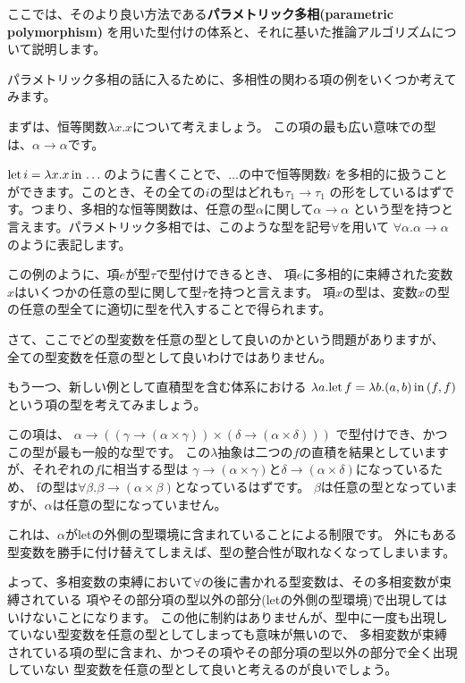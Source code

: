 ここでは、そのより良い方法である\textbf{パラメトリック多相(parametric polymorphism)}
を用いた型付けの体系と、それに基いた推論アルゴリズムについて説明します。

パラメトリック多相の話に入るために、多相性の関わる項の例をいくつか考えてみます。

まずは、恒等関数$\lambda x . x$について考えましょう。
この項の最も広い意味での型は、$\alpha \to \alpha$です。

$\mathrm{let} \, i = \lambda x . x \, \mathrm{in} \, \dots$のように書くことで、$\dots$の中で恒等関数$i$
を多相的に扱うことができます。このとき、その全ての$i$の型はどれも$\tau_1 \to \tau_1$
の形をしているはずです。つまり、多相的な恒等関数は、任意の型$\alpha$に関して$\alpha \to \alpha$
という型を持つと言えます。パラメトリック多相では、このような型を記号$\forall$を用いて
$\forall \alpha . \alpha \to \alpha$のように表記します。

この例のように、項$e$が型$\tau$で型付けできるとき、
項$e$に多相的に束縛された変数$x$はいくつかの任意の型に関して型$\tau$を持つと言えます。
項$x$の型は、変数$x$の型の任意の型全てに適切に型を代入することで得られます。

さて、ここでどの型変数を任意の型として良いのかという問題がありますが、
全ての型変数を任意の型として良いわけではありません。

もう一つ、新しい例として直積型を含む体系における
$\lambda a . \mathrm{let} \, f = \lambda b . (a, b) \, \mathrm{in} \, (f, f)$という項の型を考えてみましょう。

この項は、
$\alpha \to ((\gamma \to (\alpha \times \gamma)) \times (\delta \to (\alpha \times \delta)))$
で型付けでき、かつこの型が最も一般的な型です。
この$\lambda$抽象は二つの$f$の直積を結果としていますが、それぞれの$f$に相当する型は
$\gamma \to (\alpha \times \gamma)$と$\delta \to (\alpha \times \delta)$になっているため、
fの型は$\forall \beta . \beta \to (\alpha \times \beta)$となっているはずです。
$\beta$は任意の型となっていますが、$\alpha$は任意の型になっていません。

これは、$\alpha$がletの外側の型環境に含まれていることによる制限です。
外にもある型変数を勝手に付け替えてしまえば、型の整合性が取れなくなってしまいます。

よって、多相変数の束縛において$\forall$の後に書かれる型変数は、その多相変数が束縛されている
項やその部分項の型以外の部分(letの外側の型環境)で出現してはいけないことになります。
この他に制約はありませんが、型中に一度も出現していない型変数を任意の型としてしまっても意味が無いので、
多相変数が束縛されている項の型に含まれ、かつその項やその部分項の型以外の部分で全く出現していない
型変数を任意の型として良いと考えるのが良いでしょう。

